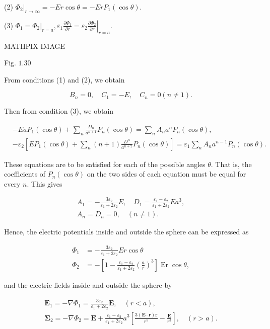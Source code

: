 \documentclass[10pt]{article}
\begin{document}
(2) $\left.\Phi_{2}\right|_{r \rightarrow \infty}=-E r \cos \theta=-E r P_{1}(\cos \theta)$.

(3) $\Phi_{1}=\left.\Phi_{2}\right|_{r=a}, \varepsilon_{1} \frac{\partial \Phi_{1}}{\partial r}=\left.\varepsilon_{2} \frac{\partial \Phi_{2}}{\partial r}\right|_{r=a}$.

MATHPIX IMAGE

Fig. $1.30$

From conditions (1) and (2), we obtain

$$
B_{n}=0, \quad C_{1}=-E, \quad C_{n}=0(n \neq 1) .
$$

Then from condition (3), we obtain

$$
\begin{aligned}
&-E a P_{1}(\cos \theta)+\sum_{n} \frac{D_{n}}{a^{n+1}} P_{n}(\cos \theta)=\sum_{n} A_{n} a^{n} P_{n}(\cos \theta), \\
&-\varepsilon_{2}\left[E P_{1}(\cos \theta)+\sum_{n}(n+1) \frac{D^{n}}{a^{n+2}} P_{n}(\cos \theta)\right]=\varepsilon_{1} \sum_{n} A_{n} a^{n-1} P_{n}(\cos \theta) .
\end{aligned}
$$

These equations are to be satisfied for each of the possible angles $\theta$. That is, the coefficients of $P_{n}(\cos \theta)$ on the two sides of each equation must be equal for every $n$. This gives

$$
\begin{array}{r}
A_{1}=-\frac{3 \varepsilon_{2}}{\varepsilon_{1}+2 \varepsilon_{2}} E, \quad D_{1}=\frac{\varepsilon_{1}-\varepsilon_{2}}{\varepsilon_{1}+2 \varepsilon_{2}} E a^{3}, \\
A_{n}=D_{n}=0, \quad(n \neq 1) .
\end{array}
$$

Hence, the electric potentials inside and outside the sphere can be expressed as

$$
\begin{aligned}
\Phi_{1} &=-\frac{3 \varepsilon_{2}}{\varepsilon_{1}+2 \varepsilon_{2}} E r \cos \theta \\
\Phi_{2} &=-\left[1-\frac{\varepsilon_{1}-\varepsilon_{2}}{\varepsilon_{1}+2 \varepsilon_{2}}\left(\frac{a}{r}\right)^{3}\right] \operatorname{Er} \cos \theta,
\end{aligned}
$$

and the electric fields inside and outside the sphere by

$$
\begin{gathered}
\mathbf{E}_{1}=-\nabla \Phi_{1}=\frac{3 \varepsilon_{2}}{\varepsilon_{1}+2 \varepsilon_{2}} \mathbf{E}, \quad(r<a), \\
\mathbf{\Sigma}_{2}=-\nabla \Phi_{2}=\mathbf{E}+\frac{\varepsilon_{1}-\varepsilon_{2}}{\varepsilon_{1}+2 \varepsilon_{2}} a^{3}\left[\frac{3(\mathbf{E} \cdot \mathbf{r}) \mathbf{r}}{r^{5}}-\frac{\mathbf{E}}{r^{3}}\right], \quad(r>a) .
\end{gathered}
$$
\end{document}
